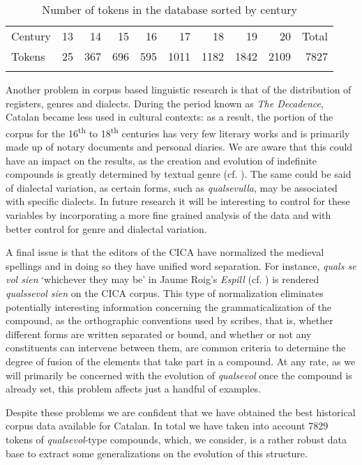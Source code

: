 \documentclass[output=paper,colorlinks,citecolor=brown]{langscibook}
\begin{document}
\begin{table}[H]
    \begin{tabularx}{\textwidth}{Xrrrrrrrrr} 
    \lsptoprule
    Century & 13 & 14 & 15 & 16 & 17 & 18 & 19 & 20 & Total \\
    Tokens & 25 & 367 & 696 & 595 & 1011 & 1182 & 1842 & 2109 & 7827\\
    \lspbottomrule
    \end{tabularx}
    \caption{Number of tokens in the database sorted by century}
    \label{tab:ka2}
\end{table}

Another problem in corpus based linguistic research is that of the distribution of registers, genres and dialects. During the period known as \textit{The Decadence}, Catalan became less used in cultural contexts: as a result, the portion of the corpus for the 16\textsuperscript{th} to 18\textsuperscript{th} centuries has very few literary works and is primarily made up of notary documents and personal diaries. We are aware that this could have an impact on the results, as the creation and evolution of indefinite compounds is greatly determined by textual genre (cf. \cite[][1107]{CompanyCompanyPozasLoyo2009}). The same could be said of dialectal variation, as certain forms, such as \textit{qualsevulla}, may be associated with specific dialects. In future research it will be interesting to control for these variables by incorporating a more fine grained analysis of the data and with better control for genre and dialectal variation.

A final issue is that the editors of the CICA have normalized the medieval spellings and in doing so they have unified word separation. For instance, \textit{quals se vol sien} ‘whichever they may be’ in Jaume Roig’s \textit{Espill} (cf. \citealt[][s.v. qualsevol]{Alcovermoll1962}) is rendered \textit{qualssevol sien} on the CICA corpus. This type of normalization eliminates potentially interesting information concerning the grammaticalization of the compound, as the orthographic conventions used by scribes, that is, whether different forms are written separated or bound, and whether or not any constituents can intervene between them, are common criteria to determine the degree of fusion of the elements that take part in a compound. At any rate, as we will primarily be concerned with the evolution of \textit{qualsevol} once the compound is already set, this problem affects just a handful of examples.

Despite these problems we are confident that we have obtained the best historical corpus data available for Catalan. In total we have taken into account 7829 tokens of \textit{qualsevol}-type compounds, which, we consider, is a rather robust data base to extract some generalizations on the evolution of this structure.
\end{document}
